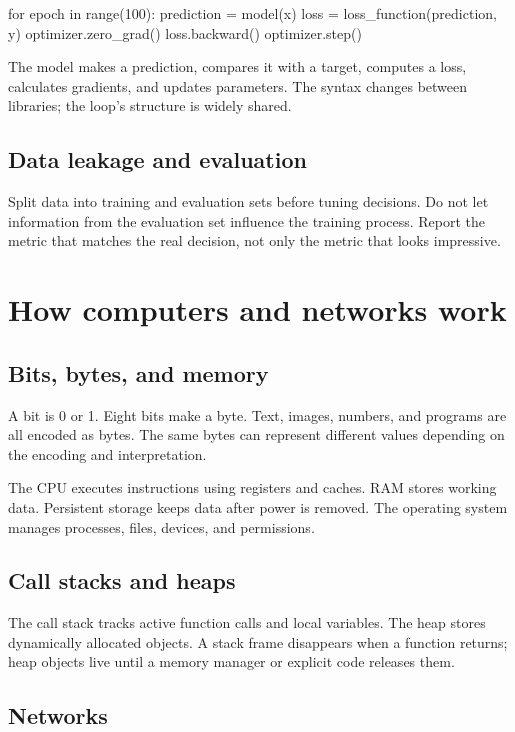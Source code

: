 \documentclass[11pt,openany,oneside]{book}
\begin{document}
\begin{code}[language=Python]
for epoch in range(100):
    prediction = model(x)
    loss = loss_function(prediction, y)
    optimizer.zero_grad()
    loss.backward()
    optimizer.step()
\end{code}

The model makes a prediction, compares it with a target, computes a loss, calculates gradients, and updates parameters. The syntax changes between libraries; the loop's structure is widely shared.

\section{Data leakage and evaluation}

Split data into training and evaluation sets before tuning decisions. Do not let information from the evaluation set influence the training process. Report the metric that matches the real decision, not only the metric that looks impressive.

\chapter{How computers and networks work}

\section{Bits, bytes, and memory}

A bit is 0 or 1. Eight bits make a byte. Text, images, numbers, and programs are all encoded as bytes. The same bytes can represent different values depending on the encoding and interpretation.

The CPU executes instructions using registers and caches. RAM stores working data. Persistent storage keeps data after power is removed. The operating system manages processes, files, devices, and permissions.

\section{Call stacks and heaps}

The call stack tracks active function calls and local variables. The heap stores dynamically allocated objects. A stack frame disappears when a function returns; heap objects live until a memory manager or explicit code releases them.

\section{Networks}
\end{document}
